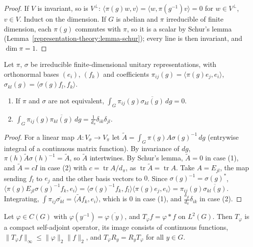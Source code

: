 \begin{proof}
If $V$ is invariant, so is $V^\perp$: $\langle\pi(g)w, v\rangle = \langle w, \pi(g^{-1})v\rangle = 0$ for $w \in V^\perp$, $v \in V$. Induct on the dimension. If $G$ is abelian and $\pi$ irreducible of finite dimension, each
$\pi(g)$ commutes with $\pi$, so it is a scalar by Schur's lemma (Lemma~\ref{representation-theory:lemma-schur}); every line is then invariant, and $\dim\pi = 1$.
\end{proof}

\begin{theorem}\label{harmonic-analysis:theorem-schur-orthogonality}
Let $\pi$, $\sigma$ be irreducible finite-dimensional unitary representations, with orthonormal bases $(e_i)$, $(f_k)$ and coefficients $\pi_{ij}(g) = \langle\pi(g)e_j, e_i\rangle$, $\sigma_{kl}(g) = \langle\sigma(g)f_l, f_k\rangle$.
\begin{enumerate}
\item If $\pi$ and $\sigma$ are not equivalent, $\int_G\pi_{ij}(g)\overline{\sigma_{kl}(g)}\,dg = 0$.
\item $\int_G\pi_{ij}(g)\overline{\pi_{kl}(g)}\,dg = \frac{1}{d_\pi}\delta_{ik}\delta_{jl}$.
\end{enumerate}
\end{theorem}

\begin{proof}
For a linear map $A \colon V_\sigma \to V_\pi$ let $\tilde A = \int_G\pi(g)A\sigma(g)^{-1}\,dg$ (entrywise integral of a continuous matrix function). By invariance of $dg$, $\pi(h)\tilde A\sigma(h)^{-1} = \tilde A$, so $\tilde A$
intertwines. By Schur's lemma, $\tilde A = 0$ in case (1), and $\tilde A = cI$ in case (2) with $c = \operatorname{tr}A/d_\pi$, as $\operatorname{tr}\tilde A = \operatorname{tr}A$. Take $A = E_{jl}$, the map sending $f_l$ to $e_j$ and the
other basis vectors to $0$. Since $\sigma(g)^{-1} = \sigma(g)^*$, $\langle\pi(g)E_{jl}\sigma(g)^{-1}f_k, e_i\rangle = \langle\sigma(g)^{-1}f_k, f_l\rangle\langle\pi(g)e_j, e_i\rangle = \pi_{ij}(g)\overline{\sigma_{kl}(g)}$. Integrating,
$\int\pi_{ij}\overline{\sigma_{kl}} = \langle\tilde Af_k, e_i\rangle$, which is $0$ in case (1), and $\frac{\delta_{jl}}{d_\pi}\delta_{ik}$ in case (2).
\end{proof}

\begin{lemma}\label{harmonic-analysis:lemma-convolution-compact}
Let $\varphi \in C(G)$ with $\varphi(y^{-1}) = \overline{\varphi(y)}$, and $T_\varphi f = \varphi * f$ on $L^2(G)$. Then $T_\varphi$ is a compact self-adjoint operator, its image consists of continuous functions, $\|T_\varphi f\|_\infty \leq
\|\varphi\|_2\|f\|_2$, and $T_\varphi R_y = R_yT_\varphi$ for all $y \in G$.
\end{lemma}

